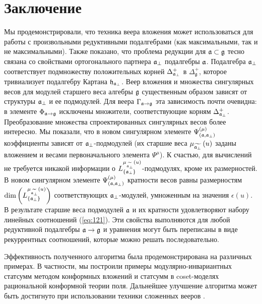\section{Заключение}
\label{sec:conclusion}

Мы продемонстрировали, что техника веера вложения может использоваться для работы с произвольными редуктивными подалгебрами (как максимальными, так и не максимальными). Также показано, что проблема редукции для  $\mathfrak{a} \subset \mathfrak{g}$ тесно связана со свойствами ортогонального партнера $ \mathfrak{a}_{\perp} $ подалгебры $\mathfrak{a}$. Подалгебра  $\mathfrak{a}_{\perp}$ соответствует подмножеству положительных корней $\Delta^{+}_{\mathfrak{a}_{\perp}}$ в $\Delta_{\mathfrak{g}}^{+}$, которое тривиализует подалгебру Картана $\mathfrak{h}_{\mathfrak{a}_{\perp}}$. Веер вложения и множества сингулярных весов для модулей старшего веса алгебры $\mathfrak{g}$ существенным образом зависят от структуры  $\mathfrak{a}_{\perp}$ и ее подмодулей.  Для веера  $\Gamma_{\mathfrak{a}\rightarrow \mathfrak{g}}$ эта зависимость почти очевидна: в элементе  $\Phi_{\mathfrak{a}\rightarrow \mathfrak{g}}$ исключены множители, соответствующие корням  $\Delta^{+}_{\mathfrak{a}_{\perp}}$. Преобразование множества спроектированных сингулярных весов более интересно. Мы показали, что в новом сингулярном элементе $\Psi ^{\left( \mu \right) }_{\left(  \mathfrak{a}, \mathfrak{a}_{\perp} \right)}$ коэффициенты зависят от $\mathfrak{a}_{\perp}$-подмодулей (их старшие веса $\mu _{\widetilde{\mathfrak{a}_{\perp}}}\left( u\right)$ заданы вложением и весами первоначального элемента $\Psi^{\mu}$). К счастью, для вычислений не требуется никакой информации о  $L^{\mu _{\widetilde{\mathfrak{a}_{\perp}}}\left( u\right)}_{\left\{ \mathfrak{a}_{\perp} \right\}}$-подмодулях, кроме их размерностей. В новом сингулярном элементе $\Psi ^{\left( \mu \right) }_{\left(  \mathfrak{a}, \mathfrak{a}_{\perp} \right)}$ кратности весов равны размерностям $\dim\left(L^{\mu _{\widetilde{\mathfrak{a}_{\perp}}}\left( u\right)}_{\left\{ \mathfrak{a}_{\perp} \right\}}\right)$ соответствующих  $\mathfrak{a}_{\perp}$-модулей, умноженным на значения $\epsilon (u)$. В результате старшие веса подмодулей $\mathfrak{a}$ и их кратности удовлетворяют набору линейных соотношений (\ref{eq:121}). Эти свойства выполняются для любой редуктивной подалгебры $\mathfrak{a}\rightarrow \mathfrak{g}$ и уравнения могут быть переписаны в виде рекуррентных соотношений, которые можно решать последовательно.

Эффективность полученного алгоритма была продемонстрирована на различных примерах. В частности, мы построили примеры модулярно-инвариантных статсумм методом конформных вложений и статсумм в coset-моделях рациональной конформной теории поля.
Дальнейшее улучшение алгоритма может быть достигнуто при использовании техники сложенных вееров \cite{il2010folded}.




